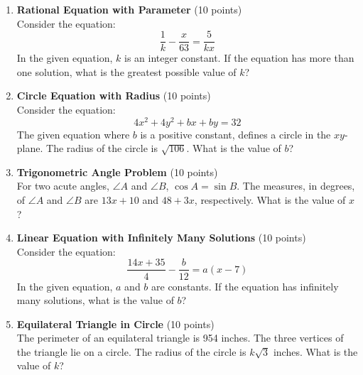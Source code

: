 \begin{enumerate}
  \item \textbf{Rational Equation with Parameter} (10 points)\\
  Consider the equation:
  \[
    \frac{1}{k}-\frac{x}{63}=\frac{5}{kx}
  \]
  In the given equation, $k$ is an integer constant. If the equation has more than one solution, what is the greatest possible value of $k$?
  \begin{subanswer}
  \end{subanswer}

  \item \textbf{Circle Equation with Radius} (10 points)\\
  Consider the equation:
  \[
    4x^2+4y^2+bx+by=32
  \]
  The given equation where $b$ is a positive constant, defines a circle in the $xy$-plane. The radius of the circle is $\sqrt{106}$. What is the value of $b$?
  \begin{subanswer}
  \end{subanswer}

  \item \textbf{Trigonometric Angle Problem} (10 points)\\
  For two acute angles, $\angle A$ and $\angle B$, $\cos A=\sin B$. The measures, in degrees, of $\angle A$ and $\angle B$ are $13x+10$ and $48+3x$, respectively. What is the value of $x$?
  \begin{subanswer}
  \end{subanswer}

  \item \textbf{Linear Equation with Infinitely Many Solutions} (10 points)\\
  Consider the equation:
  \[
    \frac{14x+35}{4}-\frac{b}{12}=a(x-7)
  \]
  In the given equation, $a$ and $b$ are constants. If the equation has infinitely many solutions, what is the value of $b$?
  \begin{subanswer}
  \end{subanswer}

  \item \textbf{Equilateral Triangle in Circle} (10 points)\\
  The perimeter of an equilateral triangle is 954 inches. The three vertices of the triangle lie on a circle. The radius of the circle is $k\sqrt{3}$ inches. What is the value of $k$?
  \begin{subanswer}
  \end{subanswer}


\end{enumerate}
